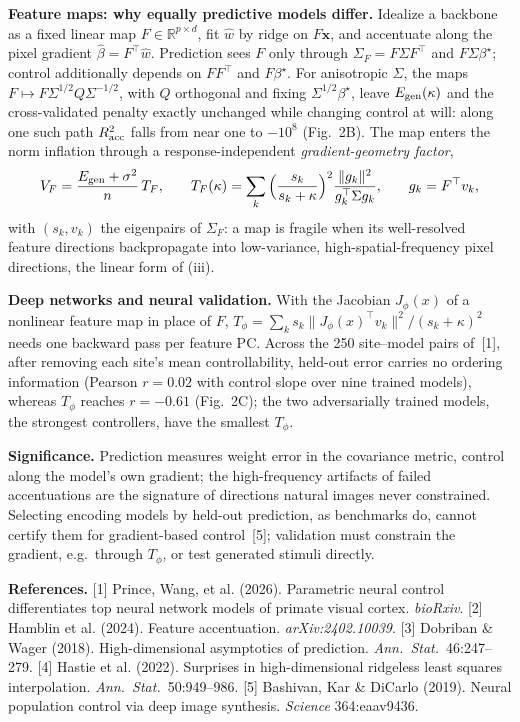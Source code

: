\documentclass[12pt,letterpaper]{article}
\newcommand{\runsection}[1]{\par\vskip0pt plus 3\baselineskip\penalty-100\vskip0pt plus -3\baselineskip\vspace{1.5pt}\noindent\textbf{#1}\hspace{0.5em}\ignorespaces}
\newcommand{\x}{\mathbf{x}}
\newcommand{\bhat}{\hat{\beta}}
\newcommand{\bstar}{{\beta^{\star}}}
\newcommand{\R}{\mathbb{R}}
\begin{document}
\runsection{Feature maps: why equally predictive models differ.}
Idealize a backbone as a fixed linear map $F\in\R^{p\times d}$, fit $\hat w$ by ridge on $F\x$, and accentuate along the pixel gradient $\bhat=F^\top\hat w$. Prediction sees $F$ only through $\Sigma_F=F\Sigma F^\top$ and $F\Sigma\bstar$; control additionally depends on $FF^\top$ and $F\bstar$. For anisotropic $\Sigma$, the maps $F\mapsto F\Sigma^{1/2}Q\Sigma^{-1/2}$, with $Q$ orthogonal and fixing $\Sigma^{1/2}\bstar$, leave $E_{\rm gen}(\kappa)$ and the cross-validated penalty exactly unchanged while changing control at will: along one such path $R^2_{\rm acc}$ falls from near one to $-10^8$ (Fig.~2B). The map enters the norm inflation through a response-independent \emph{gradient-geometry factor},
\begin{equation}\small
V_F=\frac{E_{\rm gen}+\sigma^2}{n}\,T_F,\qquad
T_F(\kappa)=\sum_k\Big(\frac{s_k}{s_k+\kappa}\Big)^2\frac{\|g_k\|^2}{g_k^\top\Sigma g_k},\qquad g_k=F^\top v_k,
\label{eq:TF}
\end{equation}
with $(s_k,v_k)$ the eigenpairs of $\Sigma_F$: a map is fragile when its well-resolved feature directions backpropagate into low-variance, high-spatial-frequency pixel directions, the linear form of (iii).

\runsection{Deep networks and neural validation.}
With the Jacobian $J_\phi(x)$ of a nonlinear feature map in place of $F$, $T_\phi=\sum_k s_k\|J_\phi(x)^\top v_k\|^2/(s_k+\kappa)^2$ needs one backward pass per feature PC. Across the 250 site--model pairs of~[1], after removing each site's mean controllability, held-out error carries no ordering information (Pearson $r=0.02$ with control slope over nine trained models), whereas $T_\phi$ reaches $r=-0.61$ (Fig.~2C); the two adversarially trained models, the strongest controllers, have the smallest $T_\phi$.

\runsection{Significance.}
Prediction measures weight error in the covariance metric, control along the model's own gradient; the high-frequency artifacts of failed accentuations are the signature of directions natural images never constrained. Selecting encoding models by held-out prediction, as benchmarks do, cannot certify them for gradient-based control~[5]; validation must constrain the gradient, e.g.\ through $T_\phi$, or test generated stimuli directly.

\vspace{3pt}
{\fontsize{10}{10.5}\selectfont\setlength{\parskip}{0pt}\noindent\textbf{References.}
[1] Prince, Wang, et al. (2026). Parametric neural control differentiates top neural network models of primate visual cortex. \emph{bioRxiv}.
[2] Hamblin et al. (2024). Feature accentuation. \emph{arXiv:2402.10039}.
[3] Dobriban \& Wager (2018). High-dimensional asymptotics of prediction. \emph{Ann.\ Stat.}\ 46:247--279.
[4] Hastie et al. (2022). Surprises in high-dimensional ridgeless least squares interpolation. \emph{Ann.\ Stat.}\ 50:949--986.
[5] Bashivan, Kar \& DiCarlo (2019). Neural population control via deep image synthesis. \emph{Science} 364:eaav9436.\par}
\end{document}

